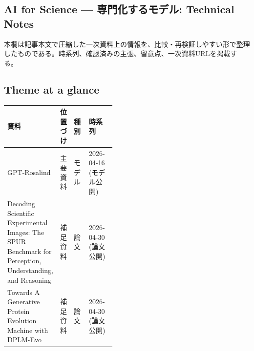 \subsection*{AI for Science — 専門化するモデル: Technical Notes}
本欄は記事本文で圧縮した一次資料上の情報を、比較・再検証しやすい形で整理したものである。時系列、確認済みの主張、留意点、一次資料URLを掲載する。
\medskip
\subsection*{Theme at a glance}
\begin{center}
\footnotesize
\begin{tabularx}{\linewidth}{@{}p{0.20\linewidth}p{0.10\linewidth}p{0.14\linewidth}X@{}}
\toprule
資料 & 位置づけ & 種別 & 時系列 \\
\midrule
GPT-Rosalind & 主要資料 & モデル & 2026-04-16 (モデル公開) \\
Decoding Scientific Experimental Images: The SPUR Benchmark for Perception, Understanding, and Reasoning & 補足資料 & 論文 & 2026-04-30 (論文公開) \\
Towards A Generative Protein Evolution Machine with DPLM-Evo & 補足資料 & 論文 & 2026-04-30 (論文公開) \\
\bottomrule
\end{tabularx}
\end{center}
\normalsize

